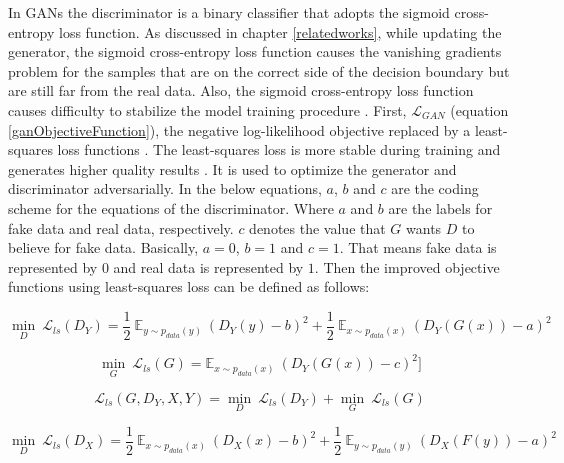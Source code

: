 In \acp{GAN} the discriminator is a binary classifier that adopts the sigmoid cross-entropy loss function. As discussed in chapter \ref{relatedworks}, while updating the generator, the sigmoid cross-entropy loss function causes the vanishing gradients problem for the samples that are on the correct side of the decision boundary but are still far from the real data.  Also, the sigmoid cross-entropy loss function causes difficulty to stabilize the model training procedure \cite{mao2017squares}. First, $\mathcal{L}_{GAN}$ (equation \ref{ganObjectiveFunction}), the negative log-likelihood objective replaced by a least-squares loss functions \cite{mao2017squares}. The least-squares loss is more stable during training and generates higher quality results \cite{mao2017squares}. It is used to optimize the generator and discriminator adversarially. In the below equations, $a$, $b$ and $c$ are the coding scheme for the equations of the discriminator. Where $a$ and $b$ are the labels for fake data and real data, respectively. $c$ denotes the value that $G$ wants $D$ to believe for fake data. Basically, $a = 0$, $b = 1$ and $c = 1$. That means fake data is represented by $0$ and real data is represented by $1$. Then the improved objective functions using least-squares loss can be defined as follows:

    \begin{equation}\label{lsgan1}
        \underset{D}{\min}\ \mathcal{L}_{ls}(D_Y) = \frac{1}{2}\ \mathbb{E}_{y \sim p_{data}(y)}\ (D_Y(y) - b)^2 + 
        \frac{1}{2}\ \mathbb{E}_{x \sim p_{data}(x)}\ (D_Y(G(x)) - a)^2
    \end{equation}
    
    \begin{equation}\label{lsgan2}
        \underset{G}{\min}\ \mathcal{L}_{ls}(G) = \mathbb{E}_{x \sim p_{data}(x)}\ (D_Y(G(x)) - c)^2]
    \end{equation}
    
    \begin{equation}\label{lsgan3}
    \mathcal{L}_{ls}(G, D_Y, X, Y) =  \underset{D}{\min}\ \mathcal{L}_{ls}(D_Y) + \underset{G}{\min}\ \mathcal{L}_{ls}(G)
    \end{equation}
    
    \begin{equation}\label{lsgan4}
        \underset{D}{\min}\ \mathcal{L}_{ls}(D_X) = \frac{1}{2}\ \mathbb{E}_{x \sim p_{data}(x)}\ (D_X(x) - b)^2 + 
        \frac{1}{2}\ \mathbb{E}_{y \sim p_{data}(y)}\ (D_X(F(y)) - a)^2
    \end{equation}
    
